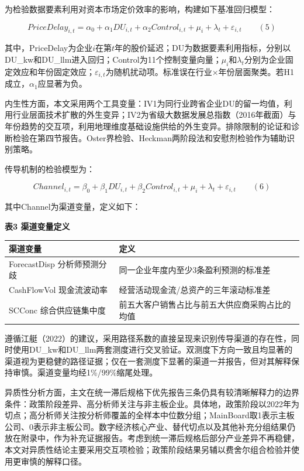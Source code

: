 为检验数据要素利用对资本市场定价效率的影响，构建如下基准回归模型：

\[PriceDelay_{i,t} = \alpha_0 + \alpha_1 DU_{i,t} + \alpha_2 Control_{i,t} + \mu_i + \lambda_t + \varepsilon_{i,t} \qquad (5)\]

其中，PriceDelay为企业\(i\)在第\(t\)年的股价延迟；DU为数据要素利用指标，分别以DU\_kw和DU\_llm进入回归；Control为11个控制变量向量；\(\mu_i\)和\(\lambda_t\)分别为企业固定效应和年份固定效应；\(\varepsilon_{i,t}\)为随机扰动项。标准误在行业×年份层面聚类。若H1成立，\(\alpha_1\)应显著为负。

内生性方面，本文采用两个工具变量：IV1为同行业跨省企业DU的留一均值，利用行业层面技术扩散的外生变异；IV2为省级大数据发展总指数（2016年截面）与年份趋势的交互项，利用地理维度基础设施供给的外生变异。排除限制的论证和诊断检验在第四节报告。Oster界检验、Heckman两阶段法和安慰剂检验作为辅助识别策略。

传导机制的检验模型为：

\[Channel_{i,t} = \beta_0 + \beta_1 DU_{i,t} + \beta_2 Control_{i,t} + \mu_i + \lambda_t + \varepsilon_{i,t} \qquad (6)\]

其中Channel为渠道变量，定义如下：

\textbf{表3 渠道变量定义}

{\def\LTcaptype{} %
\begin{longtable}[]{@{}ll@{}}
\toprule\noalign{}
渠道变量 & 定义 \\
\midrule\noalign{}
\endhead
\bottomrule\noalign{}
\endlastfoot
ForecastDisp 分析师预测分歧 & 同一企业年度内至少3条盈利预测的标准差 \\
CashFlowVol 现金流波动率 & 经营活动现金流/总资产的三年滚动标准差 \\
SCConc 综合供应链集中度 & 前五大客户销售占比与前五大供应商采购占比的均值 \\
\end{longtable}
}

遵循江艇（2022）的建议，采用路径系数的直接呈现来识别传导渠道的存在性，同时使用DU\_kw和DU\_llm两套测度进行交叉验证。双测度下方向一致且均显著的渠道视为更稳健的路径证据；仅在一套测度下显著的渠道一并报告，但对其解释保持审慎。渠道变量均经1\%/99\%缩尾处理。

异质性分析方面，主文在统一滞后规格下优先报告三条仍具有较清晰解释力的边界条件：政策阶段差异、高分析师关注与非主板企业。具体地，政策阶段以2022年为切点；高分析师关注按分析师覆盖的全样本中位数分组；MainBoard取1表示主板公司、0表示非主板公司。数字经济核心产业、替代切点以及其他补充分组结果仍放在附录中，作为补充证据报告。考虑到统一滞后规格后部分产业差异不再稳健，本文对异质性结论主要采用交互项检验；政策阶段结果另辅以费舍尔组合检验并使用更审慎的解释口径。
